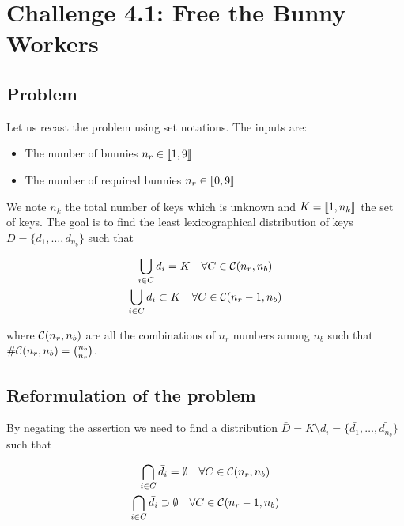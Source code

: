 \documentclass[12pt]{article}
\begin{document}
\maketitle


\section{Challenge 4.1: Free the Bunny Workers}

\subsection{Problem}

Let us recast the problem using set notations. The inputs are:

\begin{itemize}
    \item The number of bunnies $n_r \in \llbracket 1, 9 \rrbracket$
    \item The number of required bunnies $n_r \in \llbracket 0, 9 \rrbracket$
\end{itemize}

We note $n_k$ the total number of keys which is unknown and $K = \llbracket 1, n_k \rrbracket$ the set of keys. The goal is to find the least lexicographical distribution of keys $D = \{d_1, \ldots, d_{n_b}\}$ such that

\begin{gather}
    \bigcup_{i \in C} d_i = K \quad \forall C \in \mathcal{C}(n_r, n_b) \\
    \bigcup_{i \in C} d_i \subset K \quad \forall C \in \mathcal{C}(n_r - 1, n_b)
\end{gather}

\noindent where $\mathcal{C}(n_r, n_b)$ are all the combinations of $n_r$ numbers among $n_b$ such that $\#\mathcal{C}(n_r, n_b) = \binom{n_b}{n_r}$.

\subsection{Reformulation of the problem}

By negating the assertion we need to find a distribution $\bar{D} = {K \setminus d_i} = \{\bar{d_1}, \ldots, \bar{d_{n_b}}\}$ such that

\begin{gather}
    \bigcap_{i \in C} \bar{d_i} = \emptyset \quad \forall C \in \mathcal{C}(n_r, n_b) \\
    \bigcap_{i \in C} \bar{d_i} \supset \emptyset \quad \forall C \in \mathcal{C}(n_r - 1, n_b)
\end{gather}
\end{document}
